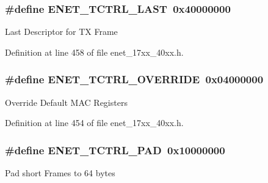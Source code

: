 \subsubsection[{\texorpdfstring{E\+N\+E\+T\+\_\+\+T\+C\+T\+R\+L\+\_\+\+L\+A\+ST}{ENET_TCTRL_LAST}}]{\setlength{\rightskip}{0pt plus 5cm}\#define E\+N\+E\+T\+\_\+\+T\+C\+T\+R\+L\+\_\+\+L\+A\+ST~0x40000000}\hypertarget{group__ENET__17XX__40XX_ga77c27155fbe90a33eccb8a4331f1c2b5}{}\label{group__ENET__17XX__40XX_ga77c27155fbe90a33eccb8a4331f1c2b5}
Last Descriptor for TX Frame 

Definition at line 458 of file enet\+\_\+17xx\+\_\+40xx.\+h.

\subsubsection[{\texorpdfstring{E\+N\+E\+T\+\_\+\+T\+C\+T\+R\+L\+\_\+\+O\+V\+E\+R\+R\+I\+DE}{ENET_TCTRL_OVERRIDE}}]{\setlength{\rightskip}{0pt plus 5cm}\#define E\+N\+E\+T\+\_\+\+T\+C\+T\+R\+L\+\_\+\+O\+V\+E\+R\+R\+I\+DE~0x04000000}\hypertarget{group__ENET__17XX__40XX_ga64b15e381cbd1fa942764060e167327f}{}\label{group__ENET__17XX__40XX_ga64b15e381cbd1fa942764060e167327f}
Override Default M\+AC Registers 

Definition at line 454 of file enet\+\_\+17xx\+\_\+40xx.\+h.

\subsubsection[{\texorpdfstring{E\+N\+E\+T\+\_\+\+T\+C\+T\+R\+L\+\_\+\+P\+AD}{ENET_TCTRL_PAD}}]{\setlength{\rightskip}{0pt plus 5cm}\#define E\+N\+E\+T\+\_\+\+T\+C\+T\+R\+L\+\_\+\+P\+AD~0x10000000}\hypertarget{group__ENET__17XX__40XX_ga1e82cc8733b002c96104d063ac42d79a}{}\label{group__ENET__17XX__40XX_ga1e82cc8733b002c96104d063ac42d79a}
Pad short Frames to 64 bytes 

